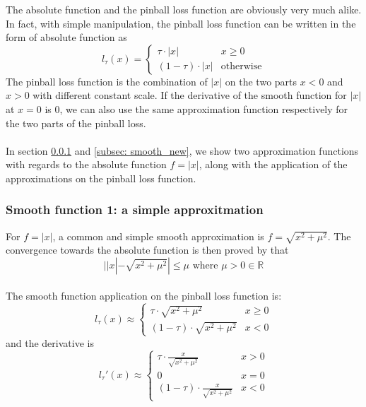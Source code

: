 The absolute function and the pinball loss function are obviously very much alike. In fact, with simple manipulation, the pinball loss function can be written in the form of absolute function as 
\begin{equation}
    l_\tau(x) = 
    \begin{cases}
        \tau \cdot |x| & {x \geq 0} \\
        (1-\tau) \cdot |x| & \text{otherwise}
    \end{cases}
\end{equation}
The pinball loss function is the combination of $|x|$ on the two parts $x<0$ and $x>0$ with different constant scale. 
If the derivative of the smooth function for $|x|$ at $x=0$ is $0$, we can also use the same approximation function respectively for the two parts of the pinball loss.
\\\\
In section \ref{subsec: smooth_sqrt} and \ref{subsec: smooth_new}, we show two approximation functions with regards to the absolute function $f = |x|$, along with the application of the approximations on the pinball loss function.

\subsubsection{Smooth function 1: a simple approxitmation}
\label{subsec: smooth_sqrt}

For $f = |x|$, a common and simple smooth approximation is $
    f = \sqrt{x^2 + \mu^2}
$.
 The convergence towards the absolute function is then proved by \citeauthor{voroninConvolutionBasedSmooth2015a}\cite{voroninConvolutionBasedSmooth2015a} that 
\begin{equation}
    ||x| - \sqrt{x^2 + \mu^2}| \leq \mu \text{  where } \mu > 0 \in \mathbb{R}
\end{equation}
\\
The smooth function application on the pinball loss function is:
\begin{equation}
    l_\tau(x) \approx 
    \begin{cases}
        \tau \cdot \sqrt{x^2 + \mu^2} & {x \geq 0} \\
        (1-\tau) \cdot \sqrt{x^2 + \mu^2} & {x < 0}
    \end{cases}
\end{equation}
and the derivative is
\begin{equation}
    l_\tau\prime(x) \approx 
    \begin{cases}
        \tau \cdot \frac{x}{\sqrt{x^2 + \mu^2}} & {x > 0} \\
        0 & {x=0} \\
        (1-\tau) \cdot \frac{x}{\sqrt{x^2 + \mu^2}} & {x<0}
    \end{cases}
\end{equation}
